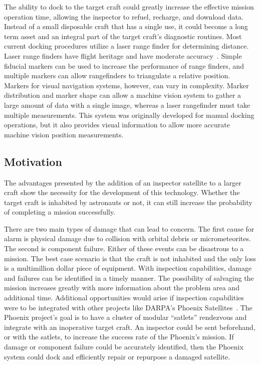 \documentclass[journal, 10pt]{IEEEtran}
\begin{document}
The ability to dock to the target craft could greatly increase the effective mission operation time, allowing the inspector to refuel, recharge, and download data.  Instead of a small disposable craft that has a single use, it could become a long term asset and an integral part of the target craft's diagnostic routines.  Most current docking procedures utilize a laser range finder for determining distance.  Laser range finders have flight heritage and have moderate accuracy~\cite{Docking}.  Simple fiducial markers can be used to increase the performance of range finders, and multiple markers can allow rangefinders to triangulate a relative position.  Markers for visual navigation systems, however, can vary in complexity.  Marker distribution and marker shape can allow a machine vision system to gather a large amount of data with a single image, whereas a laser rangefinder must take multiple measurements.  This system was originally developed for manual docking operations, but it also provides visual information to allow more accurate machine vision position measurements.



\subsection{Motivation}
The advantages presented by the addition of an inspector satellite to a larger craft show the necessity for the development of this technology.  Whether the target craft is inhabited by astronauts or not, it can still increase the probability of completing a mission successfully.

There are two main types of damage that can lead to concern.  The first cause for alarm is physical damage due to collision with orbital debris or micrometeorites.  The second is component failure.  Either of these events can be disastrous to a mission.  The best case scenario is that the craft is not inhabited and the only loss is a multimillion dollar piece of equipment.  With inspection capabilities, damage and failures can be identified in a timely manner.  The possibility of salvaging the mission increases greatly with more information about the problem area and additional time. Additional opportunities would arise if inspection capabilities were to be integrated with other projects like DARPA's Phoenix Satellites~\cite{Phoenix}.  The Phoenix project's goal is to have a cluster of modular ``satlets'' rendezvous and integrate with an inoperative target craft.  An inspector could be sent beforehand, or with the satlets, to increase the success rate of the Phoenix's mission.  If damage or component failure could be accurately identified, then the Phoenix system could dock and efficiently repair or repurpose a damaged satellite.
\end{document}
